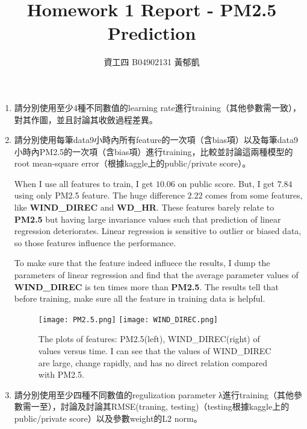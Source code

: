 \documentclass[12pt, a4paper]{article}
\author{資工四 B04902131 黃郁凱}
\title{\vspace{-2cm} Homework 1 Report - PM2.5 Prediction}
\begin{document}
\maketitle

\begin{enumerate}
\item 請分別使用至少4種不同數值的learning rate進行training（其他參數需一致），對其作圖，並且討論其收斂過程差異。

\item 請分別使用每筆data9小時內所有feature的一次項（含bias項）以及每筆data9小時內PM2.5的一次項（含bias項）進行training，比較並討論這兩種模型的root mean-square error（根據kaggle上的public/private score）。\par
When I use all features to train, I get $10.06$ on public score. But, I get $7.84$ using only PM2.5 feature. The huge difference $2.22$ comes from some features, like \textbf{WIND\_DIREC} and \textbf{WD\_HR}. These features barely relate to \textbf{PM2.5} but having large invariance values such that prediction of linear regression deteriorates. Linear regression is sensitive to outlier or biased data, so those features influence the performance.\par
To make sure that the feature indeed influece the results, I dump the parameters of linear regression and find that the average parameter values of \textbf{WIND\_DIREC} is ten times more than \textbf{PM2.5}. The results tell that before training, make sure all the feature in training data is helpful.

\begin{figure}[H]
    \centering
    \texttt{[image: PM2.5.png]}
    \texttt{[image: WIND\_DIREC.png]}
    \caption{The plots of features: PM2.5(left), WIND\_DIREC(right) of values versus time. I can see that the values of WIND\_DIREC are large, change rapidly, and has no direct relation compared with PM2.5.}
\end{figure}

\item 請分別使用至少四種不同數值的regulization parameter λ進行training（其他參數需一至），討論及討論其RMSE(traning, testing)（testing根據kaggle上的public/private score）以及參數weight的L2 norm。

\end{enumerate}
\end{document}

